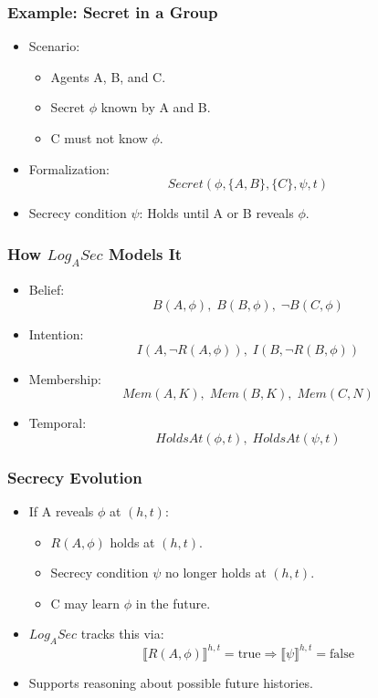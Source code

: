 \documentclass[aspectratio=169]{beamer}
\begin{document}
\begin{frame}
\frametitle{Example: Secret in a Group}
\begin{itemize}
    \item Scenario:
    \begin{itemize}
        \item Agents A, B, and C.
        \item Secret $\phi$ known by A and B.
        \item C must not know $\phi$.
    \end{itemize}
    \item Formalization:
    \[
    Secret(\phi, \{A,B\}, \{C\}, \psi, t)
    \]
    \item Secrecy condition $\psi$: Holds until A or B reveals $\phi$.
\end{itemize}
\end{frame}

\begin{frame}
\frametitle{How $Log_ASec$ Models It}
\begin{itemize}
    \item Belief:
    \[
    B(A, \phi), \; B(B, \phi), \; \neg B(C, \phi)
    \]
    \item Intention:
    \[
    I(A, \neg R(A, \phi)), \; I(B, \neg R(B, \phi))
    \]
    \item Membership:
    \[
    Mem(A, K), \; Mem(B, K), \; Mem(C, N)
    \]
    \item Temporal:
    \[
    HoldsAt(\phi, t), \; HoldsAt(\psi, t)
    \]
\end{itemize}
\end{frame}

\begin{frame}
\frametitle{Secrecy Evolution}
\begin{itemize}
    \item If A reveals $\phi$ at $(h,t)$:
    \begin{itemize}
        \item $R(A, \phi)$ holds at $(h,t)$.
        \item Secrecy condition $\psi$ no longer holds at $(h,t)$.
        \item C may learn $\phi$ in the future.
    \end{itemize}
    \item $Log_ASec$ tracks this via:
    \[
    \llbracket R(A, \phi) \rrbracket^{h,t} = \text{true}
    \Longrightarrow 
    \llbracket \psi \rrbracket^{h,t} = \text{false}
    \]
    \item Supports reasoning about possible future histories.
\end{itemize}
\end{frame}
\end{document}
